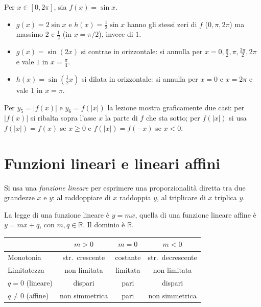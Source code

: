 \documentclass[11pt,a4paper]{article}
\begin{document}
\begin{esempio}[Seno]
Per $x \in [0, 2\pi]$, sia $f(x) = \sin x$.
\begin{itemize}
    \item $g(x) = 2\sin x$ e $h(x) = \tfrac{1}{2}\sin x$ hanno gli stessi zeri di $f$ ($0, \pi, 2\pi$) ma massimo $2$ e $\tfrac12$ (in $x = \pi/2$), invece di $1$.
    \item $g(x) = \sin(2x)$ si contrae in orizzontale: si annulla per $x = 0, \tfrac{\pi}{2}, \pi, \tfrac{3\pi}{2}, 2\pi$ e vale $1$ in $x = \tfrac{\pi}{4}$.
    \item $h(x) = \sin\!\left(\tfrac{1}{2}x\right)$ si dilata in orizzontale: si annulla per $x = 0$ e $x = 2\pi$ e vale $1$ in $x = \pi$.
\end{itemize}
\end{esempio}

\begin{osservazione}
Per $y_5 = |f(x)|$ e $y_6 = f(|x|)$ la lezione mostra graficamente due casi: per $|f(x)|$ si ribalta sopra l'asse $x$ la parte di $f$ che sta sotto; per $f(|x|)$ si usa $f(|x|) = f(x)$ se $x \ge 0$ e $f(|x|) = f(-x)$ se $x < 0$.
\end{osservazione}

\section{Funzioni lineari e lineari affini}

Si usa una \emph{funzione lineare} per esprimere una proporzionalità diretta tra due grandezze $x$ e $y$: al raddoppiare di $x$ raddoppia $y$, al triplicare di $x$ triplica $y$.

La legge di una funzione lineare è $y = mx$, quella di una funzione lineare affine è $y = mx + q$, con $m, q \in \mathbb{R}$. Il dominio è $\mathbb{R}$.

\begin{center}
\renewcommand{\arraystretch}{1.3}
\begin{tabular}{@{}lccc@{}}
\toprule
 & $m > 0$ & $m = 0$ & $m < 0$ \\
\midrule
Monotonia & str.\ crescente & costante & str.\ decrescente \\
Limitatezza & non limitata & limitata & non limitata \\
$q = 0$ (lineare) & dispari & pari & dispari \\
$q \ne 0$ (affine) & non simmetrica & pari & non simmetrica \\
\bottomrule
\end{tabular}
\end{center}
\end{document}
